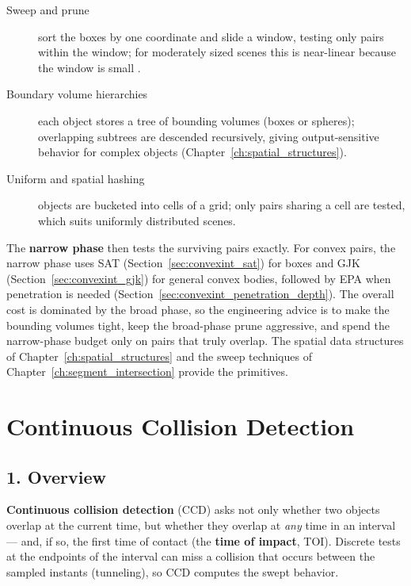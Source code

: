 \begin{description}
  \item[Sweep and prune] sort the boxes by one coordinate and slide a
    window, testing only pairs within the window; for moderately sized
    scenes this is near-linear because the window is small
    \cite{ericson2004}.
  \item[Boundary volume hierarchies] each object stores a tree of
    bounding volumes (boxes or spheres); overlapping subtrees are descended
    recursively, giving output-sensitive behavior for complex objects
    (Chapter~\ref{ch:spatial_structures}).
  \item[Uniform and spatial hashing] objects are bucketed into cells of a
    grid; only pairs sharing a cell are tested, which suits uniformly
    distributed scenes.
\end{description}

The \textbf{narrow phase} then tests the surviving pairs exactly. For
convex pairs, the narrow phase uses SAT (Section~\ref{sec:convexint_sat})
for boxes and GJK (Section~\ref{sec:convexint_gjk}) for general convex
bodies, followed by EPA when penetration is needed
(Section~\ref{sec:convexint_penetration_depth}). The overall cost is
dominated by the broad phase, so the engineering advice is to make the
bounding volumes tight, keep the broad-phase prune aggressive, and spend
the narrow-phase budget only on pairs that truly overlap. The spatial data
structures of Chapter~\ref{ch:spatial_structures} and the sweep techniques
of Chapter~\ref{ch:segment_intersection} provide the primitives.


\section{Continuous Collision Detection}
\label{sec:convexint_continuous}

\subsection{1. Overview}

\textbf{Continuous collision detection} (CCD) asks not only whether two objects overlap at the current time,
but whether they overlap at \emph{any} time in an interval --- and, if so,
the first time of contact (the \textbf{time of impact}, TOI). Discrete
tests at the endpoints of the interval can miss a collision that occurs
between the sampled instants (tunneling), so CCD computes the swept
behavior.

